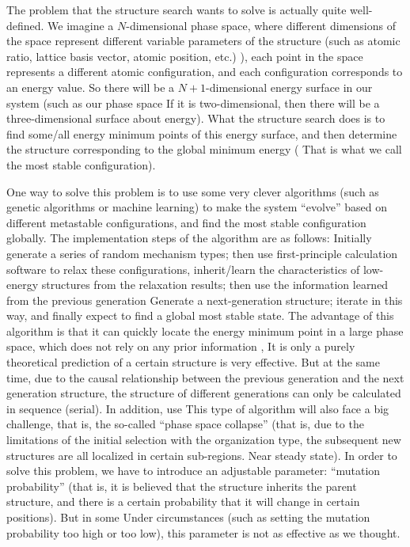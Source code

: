 \documentclass[a4paper, 10pt]{article}
\begin{document}
The problem that the structure search wants to solve is actually quite well-defined. We imagine a \(N\)-dimensional phase space, where different dimensions of the space represent different variable parameters of the structure (such as atomic ratio, lattice basis vector, atomic position, etc.) ), each point in the space represents a different atomic configuration, and each configuration corresponds to an energy value. So there will be a \(N+1\)-dimensional energy surface in our system (such as our phase space If it is two-dimensional, then there will be a three-dimensional surface about energy). What the structure search does is to find some/all energy minimum points of this energy surface, and then determine the structure corresponding to the global minimum energy ( That is what we call the most stable configuration).

One way to solve this problem is to use some very clever algorithms (such as genetic algorithms or machine learning) to make the system ``evolve'' based on different metastable configurations, and find the most stable configuration globally. The implementation steps of the algorithm are as follows: Initially generate a series of random mechanism types; then use first-principle calculation software to relax these configurations, inherit/learn the characteristics of low-energy structures from the relaxation results; then use the information learned from the previous generation Generate a next-generation structure; iterate in this way, and finally expect to find a global most stable state. The advantage of this algorithm is that it can quickly locate the energy minimum point in a large phase space, which does not rely on any prior information , It is only a purely theoretical prediction of a certain structure is very effective. But at the same time, due to the causal relationship between the previous generation and the next generation structure, the structure of different generations can only be calculated in sequence (serial). In addition, use This type of algorithm will also face a big challenge, that is, the so-called ``phase space collapse'' (that is, due to the limitations of the initial selection with the organization type, the subsequent new structures are all localized in certain sub-regions. Near steady state). In order to solve this problem, we have to introduce an adjustable parameter: ``mutation probability'' (that is, it is believed that the structure inherits the parent structure, and there is a certain probability that it will change in certain positions). But in some Under circumstances (such as setting the mutation probability too high or too low), this parameter is not as effective as we thought.
\end{document}
